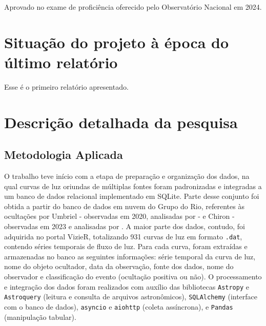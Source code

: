 \documentclass[12pt]{article}
\numberwithin{equation}{section}
\begin{document}
Aprovado no exame de proficiência oferecido pelo Observatório Nacional em 2024.




\section{Situação do projeto à época do último relatório}

Esse é o primeiro relatório apresentado.



\section{\sc Descrição detalhada da pesquisa}

\subsection{Metodologia Aplicada}\label{sec_met}
\indent
O trabalho teve início com a etapa de preparação e organização dos dados, na qual curvas de luz oriundas de múltiplas fontes foram padronizadas e integradas a um banco de dados relacional implementado em SQLite. Parte desse conjunto foi obtida a partir do banco de dados em nuvem do Grupo do Rio, referentes às ocultações por Umbriel - observadas em 2020, analisadas por \cite{Umbriel2020} - e Chiron - observadas em 2023 e analisadas por \cite{Chiron2023}. A maior parte dos dados, contudo, foi adquirida no portal VizieR, totalizando 931 curvas de luz em formato \texttt{.dat}, contendo séries temporais de fluxo de luz. Para cada curva, foram extraídas e armazenadas no banco as seguintes informações: série temporal da curva de luz, nome do objeto ocultador, data da observação, fonte dos dados, nome do observador e classificação do evento (ocultação positiva ou não). O processamento e integração dos dados foram realizados com auxílio das bibliotecas \texttt{Astropy} e \texttt{Astroquery} (leitura e consulta de arquivos astronômicos), \texttt{SQLAlchemy} (interface com o banco de dados), \texttt{asyncio} e \texttt{aiohttp} (coleta assíncrona), e \texttt{Pandas} (manipulação tabular).
\end{document}
